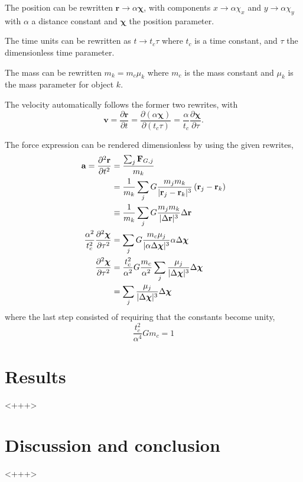 \documentclass[a4paper,11pt]{article}
\begin{document}
The position can be rewritten $\mathbf{r} \to \alpha \boldsymbol{\chi}$, with components $x \to \alpha \chi_x$ and $y \to \alpha \chi_y$ with $\alpha$ a distance constant and $\boldsymbol{\chi}$ the position parameter.

The time units can be rewritten as $t \to t_c \tau$ where $t_c$ is a time constant, and $\tau$ the dimensionless time parameter.

The mass can be rewritten $m_k = m_c \mu_k$ where $m_c$ is the mass constant and $\mu_k$ is the mass parameter for object $k$.

The velocity automatically follows the former two rewrites, with 
\[ \mathbf{v} = \frac{\partial \mathbf{r}}{\partial t} = \frac{\partial (\alpha \boldsymbol{\chi})}{\partial (t_c \tau)} = \frac{\alpha}{t_c} \frac{\partial \boldsymbol{\chi}}{\partial \tau}. \]

The force expression can be rendered dimensionless by using the given rewrites,
\begin{align}
    \mathbf{a} = \frac{\partial^2 \mathbf{r}}{\partial t^2} &= \frac{\sum_j \mathbf{F}_{G,j}}{m_k} \notag \\
    &= \frac{1}{m_k} \sum_j G \frac{m_j m_k}{| \mathbf{r}_j - \mathbf{r}_k |^3} \left( \mathbf{r}_j - \mathbf{r}_k \right) \notag \\
    &\equiv     \frac{1}{m_k} \sum_j G \frac{m_j m_k}{| \Delta \mathbf{r} |^3} \Delta \mathbf{r} \notag \\
    \frac{\alpha^2}{t_c^2} \frac{\partial^2 \boldsymbol{\chi}}{\partial \tau^2} &= \sum_j G \frac{m_c \mu_j}{|\alpha \Delta \boldsymbol{\chi}|^3} \alpha \Delta \boldsymbol{\chi} \notag \\
    \frac{\partial^2 \boldsymbol{\chi}}{\partial \tau^2} &= \frac{t_c^2}{\alpha^2} G \frac{m_c}{\alpha^2} \sum_j \frac{\mu_j}{|\Delta \boldsymbol{\chi} |^3} \Delta \boldsymbol{\chi} \notag \\
    &= \sum_j \frac{\mu_j}{|\Delta \boldsymbol{\chi}|^3} \Delta \boldsymbol{\chi}
    \label{eq:dimless}
\end{align}
where the last step consisted of requiring that the constants become unity,
\begin{equation}
    \frac{t_c^2}{\alpha^4} G m_c = 1
    \label{eq:unity}
\end{equation}

\section{Results}<+++>

\section{Discussion and conclusion}<+++>



\end{document}
